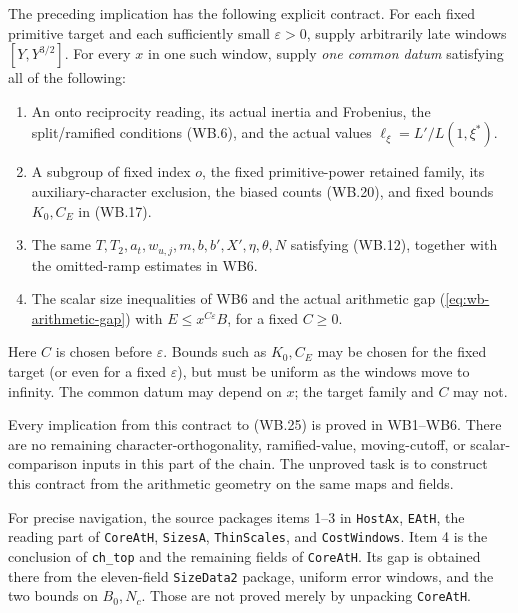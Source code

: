 The preceding implication has the following explicit contract. For
each fixed primitive target and each sufficiently small
$\varepsilon>0$, supply arbitrarily late windows
$[Y,Y^{3/2}]$. For every $x$ in one such window, supply
\emph{one common datum} satisfying all of the following:
\begin{enumerate}
\item An onto reciprocity reading, its actual inertia and Frobenius,
the split/ramified conditions (WB.6), and the actual values
$\ell_\xi=L'/L(1,\xi^*)$.
\item A subgroup of fixed index $o$, the fixed primitive-power
retained family, its auxiliary-character exclusion, the biased
counts (WB.20), and fixed bounds $K_0,C_E$ in (WB.17).
\item The same $T,T_2,a_t,w_{u,j},m,b,b',X',\eta,\theta,N$
satisfying (WB.12), together with the omitted-ramp estimates in WB6.
\item The scalar size inequalities of WB6 and the actual arithmetic
gap (\ref{eq:wb-arithmetic-gap}) with
$E\le x^{C\varepsilon}B$, for a fixed $C\ge0$.
\end{enumerate}
Here $C$ is chosen before $\varepsilon$. Bounds such as $K_0,C_E$
may be chosen for the fixed target (or even for a fixed
$\varepsilon$), but must be uniform as the windows move to infinity.
The common datum may depend on $x$; the target family and $C$ may not.

Every implication from this contract to (WB.25) is proved in
WB1--WB6. There are no remaining character-orthogonality,
ramified-value, moving-cutoff, or scalar-comparison inputs in this
part of the chain. The unproved task is to construct this contract
from the arithmetic geometry on the same maps and fields.

For precise navigation, the source packages items 1--3 in
\texttt{HostAx}, \texttt{EAtH}, the reading part of
\texttt{CoreAtH}, \texttt{SizesA}, \texttt{ThinScales}, and
\texttt{CostWindows}. Item 4 is the conclusion of \texttt{ch\_top}
and the remaining fields of \texttt{CoreAtH}. Its gap is obtained
there from the eleven-field \texttt{SizeData2} package, uniform
error windows, and the two bounds on $B_0,N_c$. Those are not proved
merely by unpacking \texttt{CoreAtH}.


